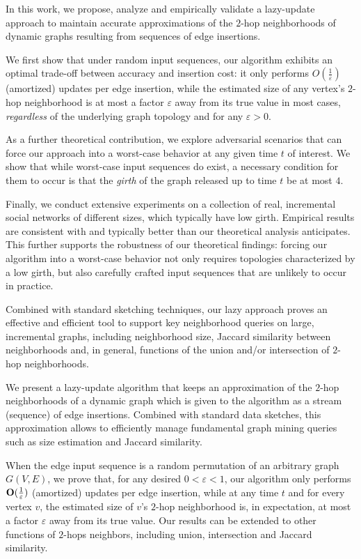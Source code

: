 In this work, we propose, analyze and empirically validate a lazy-update approach to  maintain accurate approximations  of  the $2$-hop neighborhoods of dynamic graphs resulting from sequences of edge insertions. 

We first show that under random input sequences, our algorithm exhibits an optimal trade-off between accuracy and insertion cost: it only performs $O(\frac{1}{\varepsilon})$ (amortized) updates per edge insertion, while the estimated size of any vertex's $2$-hop neighborhood is at most a factor $\varepsilon$ away from its true value in most cases, \emph{regardless} of the underlying graph topology and for any $\varepsilon > 0$. 

As a further theoretical contribution, we explore adversarial scenarios that can force our approach into a worst-case behavior at any given time $t$ of interest. 
We show that while worst-case input sequences do exist, a necessary condition for them to occur is that the \textit{girth} of the graph released up to time $t$ be at most $4$. 

Finally, we conduct extensive experiments on a collection of real, incremental social networks of different sizes, which typically have low girth. Empirical results are consistent with and typically better than our theoretical analysis anticipates. This further supports the robustness of our theoretical findings: forcing our algorithm into a worst-case behavior not only requires topologies characterized by a low girth, but also carefully crafted input sequences that are unlikely to occur in practice. 

Combined with standard sketching techniques, our lazy approach proves an effective and efficient tool to support key neighborhood queries on large, incremental graphs, including neighborhood size, Jaccard similarity between neighborhoods and, in general, functions of the union and/or intersection of $2$-hop neighborhoods.

\iffalse
We present a lazy-update algorithm that keeps an approximation  of  the $2$-hop neighborhoods of a dynamic graph which is given to the algorithm as a stream (sequence) of edge insertions. Combined with standard data sketches, this  approximation allows to efficiently manage fundamental graph mining queries such as size estimation and Jaccard similarity.

When the edge input sequence is a random permutation of an arbitrary graph $G(V,E)$, we prove that, for any desired $0 < \varepsilon < 1$, our algorithm only performs $\mathbf{O}(\frac{1}{\varepsilon})$ (amortized) updates per edge insertion, while at any time $t$ and for every vertex $v$, the estimated size of $v$'s $2$-hop neighborhood is, in expectation,  at most a factor $\varepsilon$ away from its true value. 
Our results can be extended  to other functions of $2$-hops neighbors, including union, intersection and Jaccard similarity.

